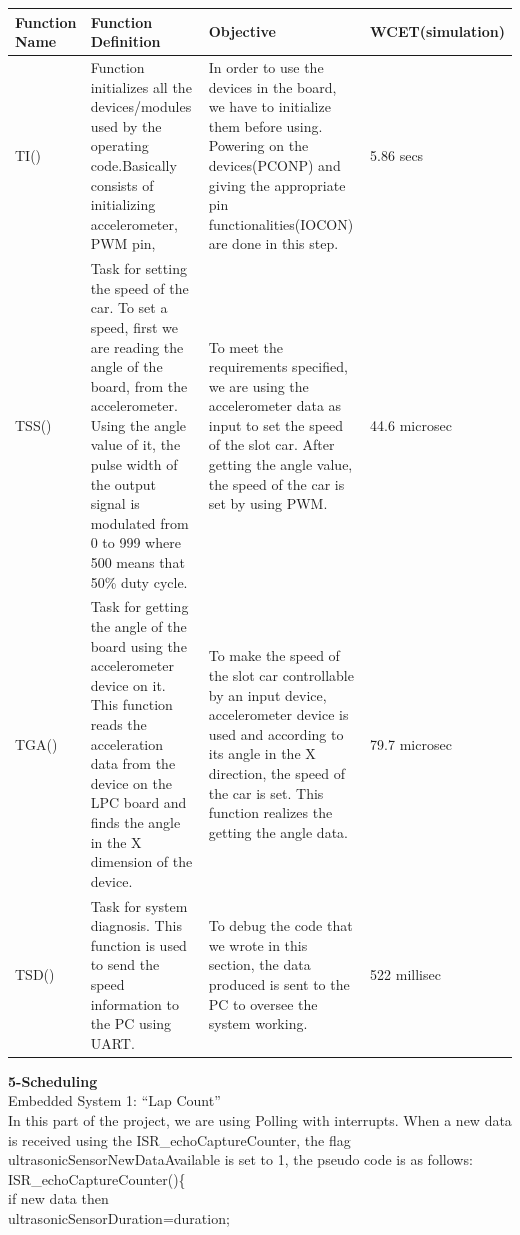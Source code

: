 \documentclass{article}
\begin{document}
\begin{tabular}{| C{4cm} | C{4cm} | C{4cm} | C{2cm} |}
\hline
\textbf{Function Name} &\textbf{Function Definition}  & \textbf{Objective} &\textbf{WCET}\linebreak(simulation)\\
\hline
TI()&Function initializes all the devices/modules used by the operating code.Basically consists of initializing
accelerometer, PWM pin, &In order to use the devices in the board, we have to initialize them before using.
Powering on the devices(PCONP) and giving the appropriate pin functionalities(IOCON) are done in this step.&5.86 secs\\
\hline
TSS()&Task for setting the speed of the car. To set a speed, first we are reading the angle of the board, from the
accelerometer. Using the angle value of it, the pulse width of the output signal is modulated from 0 to 999 where 500
means that 50\% duty cycle.& To meet the requirements specified, we are using the accelerometer data as input to
set the speed of the slot car. After getting the angle value, the speed of the car is set by using PWM.&44.6 microsec\\
\hline
TGA()&Task for getting the angle of the board using the accelerometer device on it. This function reads the
acceleration data from the device on the LPC board and finds the angle in the X dimension of the device.&
To make the speed of the slot car controllable by an input device, accelerometer device is used and according to
its angle in the X direction, the speed of the car is set. This function realizes the getting the angle data.&79.7 microsec\\
\hline
TSD()&Task for system diagnosis. This function is used to send the speed information to the PC using UART.&To debug the
code that we wrote in this section, the data produced is sent to the PC to oversee the system working.&522 millisec\\
\hline
\end{tabular}
\clearpage
{\huge\textbf {5-Scheduling}}
\\
{\huge {Embedded System 1: “Lap Count”}}
\\
In this part of the project, we are using Polling with interrupts. When a new data
is received using the ISR\_echoCaptureCounter, the flag ultrasonicSensorNewDataAvailable is
set to 1, the pseudo code is as follows:\\
ISR\_echoCaptureCounter()\{\\ if new data then\\ ultrasonicSensorDuration=duration;
\end{document}
